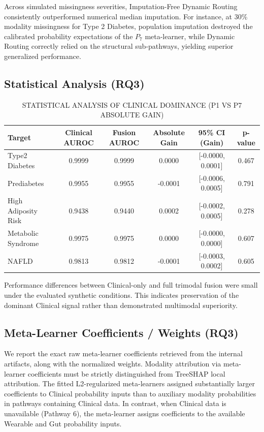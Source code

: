 \documentclass[journal, twocolumn]{IEEEtran}
\begin{document}
Across simulated missingness severities, Imputation-Free Dynamic Routing consistently outperformed numerical median imputation. For instance, at 30\% modality missingness for Type 2 Diabetes, population imputation destroyed the calibrated probability expectations of the $P_7$ meta-learner, while Dynamic Routing correctly relied on the structural sub-pathways, yielding superior generalized performance.

\subsection{Statistical Analysis (RQ3)}
\begin{table}[htbp]
\centering
\caption{STATISTICAL ANALYSIS OF CLINICAL DOMINANCE (P1 VS P7 ABSOLUTE GAIN)}
\label{tab:statistical}
\begin{tabular}{@{}l cccc c@{}}
\toprule
\textbf{Target} & \textbf{Clinical AUROC} & \textbf{Fusion AUROC} & \textbf{Absolute Gain} & \textbf{95\% CI (Gain)} & \textbf{p-value} \\
\midrule
Type2 Diabetes & 0.9999 & 0.9999 & 0.0000 & [-0.0000, 0.0001] & 0.467 \\
Prediabetes & 0.9955 & 0.9955 & -0.0001 & [-0.0006, 0.0005] & 0.791 \\
High Adiposity Risk & 0.9438 & 0.9440 & 0.0002 & [-0.0002, 0.0005] & 0.278 \\
Metabolic Syndrome & 0.9975 & 0.9975 & 0.0000 & [-0.0000, 0.0000] & 0.607 \\
NAFLD & 0.9813 & 0.9812 & -0.0001 & [-0.0003, 0.0002] & 0.605 \\
\bottomrule
\end{tabular}
\end{table}

Performance differences between Clinical-only and full trimodal fusion were small under the evaluated synthetic conditions. This indicates preservation of the dominant Clinical signal rather than demonstrated multimodal superiority.

\subsection{Meta-Learner Coefficients / Weights (RQ3)}
We report the exact raw meta-learner coefficients retrieved from the internal artifacts, along with the normalized weights. Modality attribution via meta-learner coefficients must be strictly distinguished from TreeSHAP local attribution. 
The fitted L2-regularized meta-learners assigned substantially larger coefficients to Clinical probability inputs than to auxiliary modality probabilities in pathways containing Clinical data. In contrast, when Clinical data is unavailable (Pathway 6), the meta-learner assigns coefficients to the available Wearable and Gut probability inputs.
\end{document}
